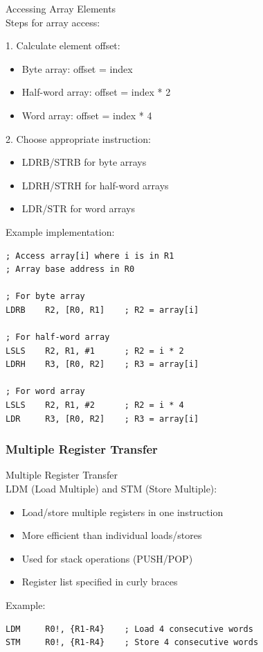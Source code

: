\begin{code}{Accessing Array Elements}\\
Steps for array access:

1. Calculate element offset:
   \begin{itemize}
     \item Byte array: offset = index
     \item Half-word array: offset = index * 2
     \item Word array: offset = index * 4
   \end{itemize}

2. Choose appropriate instruction:
   \begin{itemize}
     \item LDRB/STRB for byte arrays
     \item LDRH/STRH for half-word arrays
     \item LDR/STR for word arrays
   \end{itemize}

Example implementation:
\begin{lstlisting}[language=armasm, style=basesmol]
; Access array[i] where i is in R1
; Array base address in R0

; For byte array
LDRB    R2, [R0, R1]    ; R2 = array[i]

; For half-word array
LSLS    R2, R1, #1      ; R2 = i * 2
LDRH    R3, [R0, R2]    ; R3 = array[i]

; For word array
LSLS    R2, R1, #2      ; R2 = i * 4
LDR     R3, [R0, R2]    ; R3 = array[i]
\end{lstlisting}
\end{code}


\columnbreak


\subsubsection{Multiple Register Transfer}

\begin{definition}{Multiple Register Transfer}\\
LDM (Load Multiple) and STM (Store Multiple):
\begin{itemize}
  \item Load/store multiple registers in one instruction
  \item More efficient than individual loads/stores
  \item Used for stack operations (PUSH/POP)
  \item Register list specified in curly braces
\end{itemize}

Example:
\begin{lstlisting}[language=armasm, style=basesmol]
LDM     R0!, {R1-R4}    ; Load 4 consecutive words
STM     R0!, {R1-R4}    ; Store 4 consecutive words
\end{lstlisting}
\end{definition}

